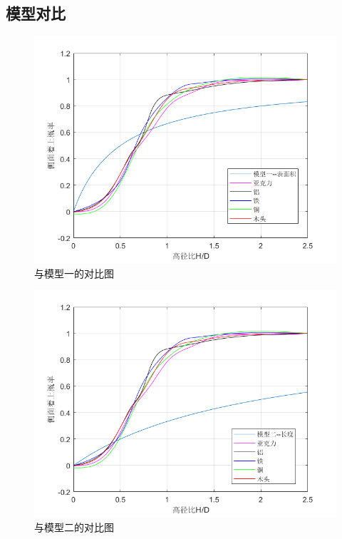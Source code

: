 \documentclass[UTF8]{gapd}
\begin{document}
\subsection{模型对比}
\begin{figure}[H]%
	\centering
	\includegraphics[width=1\columnwidth]{images/比较1}
	\caption{与模型一的对比图}
	\label{fig:P2}%
\end{figure}
\begin{figure}[H]%
	\centering
	\includegraphics[width=1\columnwidth]{images/比较2}
	\caption{与模型二的对比图}
	\label{fig:P2}%
\end{figure}
\end{document}

